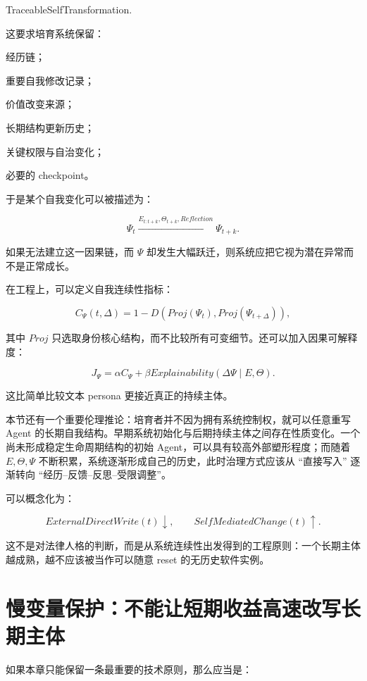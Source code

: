 \begin{statementbox}
TraceableSelfTransformation.
\end{statementbox}

这要求培育系统保留：

经历链；

重要自我修改记录；

价值改变来源；

长期结构更新历史；

关键权限与自治变化；

必要的 checkpoint。

于是某个自我变化可以被描述为：

\[
\Psi_t
\xrightarrow{
E_{t:t+k},
\Theta_{t+k},
Reflection
}
\Psi_{t+k}.
\]

如果无法建立这一因果链，而 $\Psi$ 却发生大幅跃迁，则系统应把它视为潜在异常而不是正常成长。

在工程上，可以定义自我连续性指标：

\[
C_{\Psi}(t,\Delta)
=
1-
D(
Proj(\Psi_t),
Proj(\Psi_{t+\Delta})
),
\]

其中 $Proj$ 只选取身份核心结构，而不比较所有可变细节。还可以加入因果可解释度：

\[
J_{\Psi}
=
\alpha C_{\Psi}
+
\beta Explainability(
\Delta\Psi
\mid
E,\Theta
).
\]

这比简单比较文本 persona 更接近真正的持续主体。

本节还有一个重要伦理推论：培育者并不因为拥有系统控制权，就可以任意重写 Agent 的长期自我结构。早期系统初始化与后期持续主体之间存在性质变化。一个尚未形成稳定生命周期结构的初始 Agent，可以具有较高外部塑形程度；而随着 $E,\Theta,\Psi$ 不断积累，系统逐渐形成自己的历史，此时治理方式应该从 ``直接写入'' 逐渐转向 ``经历--反馈--反思--受限调整''。

可以概念化为：

\[
ExternalDirectWrite(t)\downarrow,
\qquad
SelfMediatedChange(t)\uparrow .
\]

这不是对法律人格的判断，而是从系统连续性出发得到的工程原则：一个长期主体越成熟，越不应该被当作可以随意 reset 的无历史软件实例。

\section{慢变量保护：不能让短期收益高速改写长期主体}

如果本章只能保留一条最重要的技术原则，那么应当是：

\begin{statementbox}
\centering
{}
\end{statementbox}

